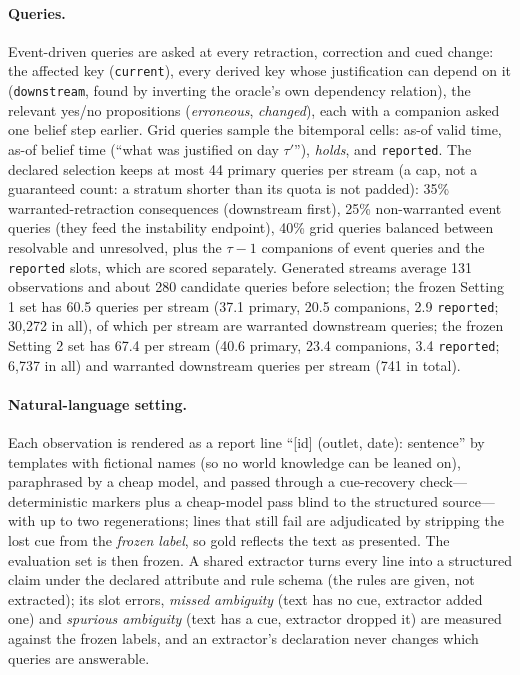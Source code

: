 \paragraph{Queries.} Event-driven queries are asked at every retraction, correction and cued change: the affected key (\texttt{current}), every derived key whose justification can depend on it (\texttt{downstream}, found by inverting the oracle's own dependency relation), the relevant yes/no propositions (\emph{erroneous}, \emph{changed}), each with a companion asked one belief step earlier. Grid queries sample the bitemporal cells: as-of valid time, as-of belief time (``what was justified on day $\tau'$''), \emph{holds}, and \texttt{reported}. The declared selection keeps at most 44 primary queries per stream (a cap, not a guaranteed count: a stratum shorter than its quota is not padded): 35\% warranted-retraction consequences (downstream first), 25\% non-warranted event queries (they feed the instability endpoint), 40\% grid queries balanced between resolvable and unresolved, plus the $\tau-1$ companions of event queries and the \texttt{reported} slots, which are scored separately. Generated streams average 131 observations and about 280 candidate queries before selection; the frozen Setting 1 set has 60.5 queries per stream (37.1 primary, 20.5 companions, 2.9 \texttt{reported}; 30{,}272 in all), of which \sOneWarrPerStream{} per stream are warranted downstream queries; the frozen Setting 2 set has 67.4 per stream (40.6 primary, 23.4 companions, 3.4 \texttt{reported}; 6{,}737 in all) and \sTwoWarrPerStream{} warranted downstream queries per stream (741 in total).

\paragraph{Natural-language setting.} Each observation is rendered as a report line ``[id] (outlet, date): sentence'' by templates with fictional names (so no world knowledge can be leaned on), paraphrased by a cheap model, and passed through a cue-recovery check---deterministic markers plus a cheap-model pass blind to the structured source---with up to two regenerations; lines that still fail are adjudicated by stripping the lost cue from the \emph{frozen label}, so gold reflects the text as presented. The evaluation set is then frozen. A shared extractor turns every line into a structured claim under the declared attribute and rule schema (the rules are given, not extracted); its slot errors, \emph{missed ambiguity} (text has no cue, extractor added one) and \emph{spurious ambiguity} (text has a cue, extractor dropped it) are measured against the frozen labels, and an extractor's declaration never changes which queries are answerable.
